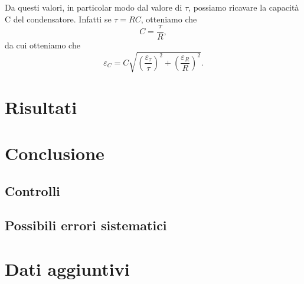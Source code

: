 \documentclass[italian, a4paper, 10pt, twocolumn]{../../style/lab_unige}
\newcommand{\mstdErr}[1]{\varepsilon_{#1}}
\begin{document}
    Da questi valori, in particolar modo dal valore di $\tau$, possiamo ricavare la capacità C del condensatore. Infatti se $\tau=RC$, otteniamo che \[C=\frac{\tau}{R},\] da cui otteniamo che \[\mstdErr{C}=C\sqrt{\left(\frac{\mstdErr{\tau}}{\tau}\right)^2+\left(\frac{\mstdErr{R}}{R}\right)^2}.\]

    \section{Risultati}
    \label{section:results}

    \section{Conclusione}
    \label{section:conclusion}

    \subsection{Controlli}

    \subsection{Possibili errori sistematici}

    \appendix

    \setcounter{table}{0}
    \renewcommand{\thetable}{A\arabic{table}}

    \section{Dati aggiuntivi}
    \label{section:appendix_EXT_DATA}
    
\end{document}
